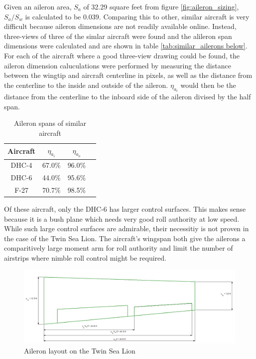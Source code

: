 \documentclass[conf]{new-aiaa}
\begin{document}
Given an aileron area, $S_a$ of 32.29 square feet from figure \ref{fig:aileron_sizing}, $S_a/S_w$ is calculated to be 0.039. Comparing this to other, similar aircraft is very difficult because aileron dimensions are not readily available online. Instead, three-views of three of the simlar aircraft were found and the alileron span dimensions were calculated and are shown in table \ref{tab:similar_ailerons below}. For each of the aircraft where a good three-view drawing could be found, the aileron dimension caluculations were performed by measuring the distance between the wingtip and aircraft centerline in pixels, as well as the distance from the centerline to the inside and outside of the aileron. $\eta_{a_i}$ would then be the distance from the centerline to the inboard side of the aileron divised by the half span.

\begin{table}[H]
\centering
\caption{Aileron spans of similar aircraft}
\begin{tabular}{|c|c|c|c|}\hline
    Aircraft & $\eta_{a_i}$ & $\eta_{a_o}$ \\ \hline
    DHC-4 & 67.0\%          & 96.0\%        \\ \hline
    DHC-6 & 44.0\%          & 95.6\%        \\ \hline
    F-27  & 70.7\%          & 98.5\%        \\ \hline
\end{tabular}
\label{tab:similar_ailerons}
\end{table}

Of these aircraft, only the DHC-6 has larger control surfaces. This makes sense because it is a bush plane which needs very good roll authority at low speed. While such large control surfaces are admirable, their necessitiy is not proven in the case of the Twin Sea Lion. The aircraft's wingspan both give the ailerons a comparitively large moment arm for roll authority and limit the number of airstrips where nimble roll control might be required.


\begin{figure}[H]
    \includegraphics[width=\textwidth]{Report3Printouts/Wing_and_Aileron/aileron_sizing_plot.png}
    \caption{Aileron layout on the Twin Sea Lion}
    \label{fig:aileron_sizing_plot}
\end{figure}
\end{document}

